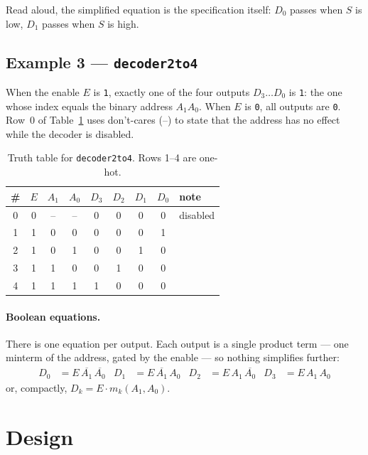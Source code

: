 Read aloud, the simplified equation is the specification itself: $D_0$ passes when
$S$ is low, $D_1$ passes when $S$ is high.

\subsection{Example 3 --- \texttt{decoder2to4}}

When the enable $E$ is \texttt{1}, exactly one of the four outputs $D_3 \dots D_0$
is \texttt{1}: the one whose index equals the binary address $A_1A_0$. When $E$ is
\texttt{0}, all outputs are \texttt{0}. Row~0 of Table~\ref{tab:lab00-dec} uses
don't-cares (--) to state that the address has no effect while the decoder is
disabled.

\begin{table}[H]
\centering
\caption{Truth table for \texttt{decoder2to4}. Rows 1--4 are one-hot.}
\label{tab:lab00-dec}
\begin{tabular}{c|ccc|cccc|l}
\toprule
\# & $E$ & $A_1$ & $A_0$ & $D_3$ & $D_2$ & $D_1$ & $D_0$ & note \\
\midrule
0 & 0 & -- & -- & 0 & 0 & 0 & 0 & disabled \\
1 & 1 & 0 & 0 & 0 & 0 & 0 & 1 & \\
2 & 1 & 0 & 1 & 0 & 0 & 1 & 0 & \\
3 & 1 & 1 & 0 & 0 & 1 & 0 & 0 & \\
4 & 1 & 1 & 1 & 1 & 0 & 0 & 0 & \\
\bottomrule
\end{tabular}
\end{table}

\paragraph{Boolean equations.} There is one equation per output. Each output is a
single product term --- one minterm of the address, gated by the enable --- so
nothing simplifies further:
\begin{align*}
D_0 &= E\,\overline{A_1}\,\overline{A_0} &
D_1 &= E\,\overline{A_1}\,A_0 &
D_2 &= E\,A_1\,\overline{A_0} &
D_3 &= E\,A_1\,A_0
\end{align*}
or, compactly, $D_k = E \cdot m_k(A_1, A_0)$.

\section{Design}

